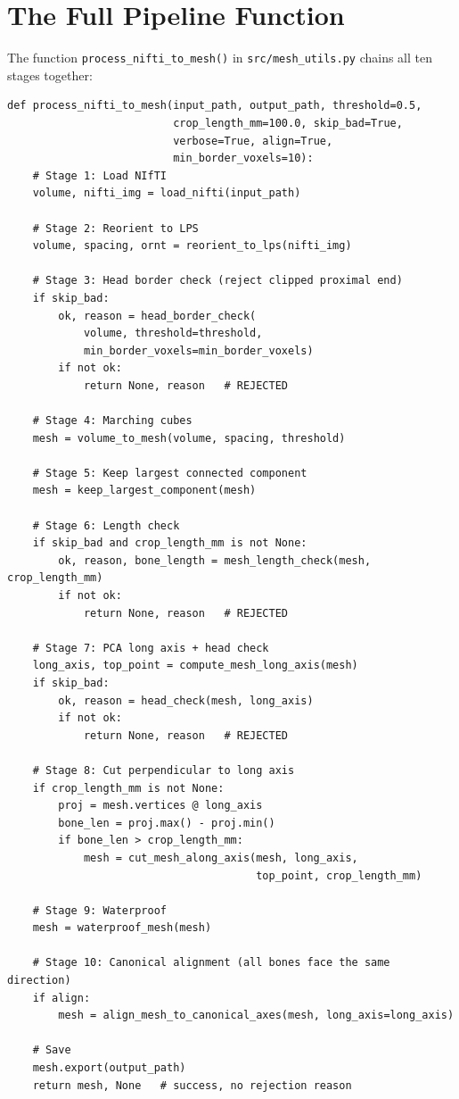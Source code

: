 \documentclass[12pt,a4paper]{article}
\begin{document}
\section{The Full Pipeline Function}

The function \texttt{process\_nifti\_to\_mesh()} in \texttt{src/mesh\_utils.py}
chains all ten stages together:

\begin{lstlisting}
def process_nifti_to_mesh(input_path, output_path, threshold=0.5,
                          crop_length_mm=100.0, skip_bad=True,
                          verbose=True, align=True,
                          min_border_voxels=10):
    # Stage 1: Load NIfTI
    volume, nifti_img = load_nifti(input_path)

    # Stage 2: Reorient to LPS
    volume, spacing, ornt = reorient_to_lps(nifti_img)

    # Stage 3: Head border check (reject clipped proximal end)
    if skip_bad:
        ok, reason = head_border_check(
            volume, threshold=threshold,
            min_border_voxels=min_border_voxels)
        if not ok:
            return None, reason   # REJECTED

    # Stage 4: Marching cubes
    mesh = volume_to_mesh(volume, spacing, threshold)

    # Stage 5: Keep largest connected component
    mesh = keep_largest_component(mesh)

    # Stage 6: Length check
    if skip_bad and crop_length_mm is not None:
        ok, reason, bone_length = mesh_length_check(mesh, crop_length_mm)
        if not ok:
            return None, reason   # REJECTED

    # Stage 7: PCA long axis + head check
    long_axis, top_point = compute_mesh_long_axis(mesh)
    if skip_bad:
        ok, reason = head_check(mesh, long_axis)
        if not ok:
            return None, reason   # REJECTED

    # Stage 8: Cut perpendicular to long axis
    if crop_length_mm is not None:
        proj = mesh.vertices @ long_axis
        bone_len = proj.max() - proj.min()
        if bone_len > crop_length_mm:
            mesh = cut_mesh_along_axis(mesh, long_axis,
                                       top_point, crop_length_mm)

    # Stage 9: Waterproof
    mesh = waterproof_mesh(mesh)

    # Stage 10: Canonical alignment (all bones face the same direction)
    if align:
        mesh = align_mesh_to_canonical_axes(mesh, long_axis=long_axis)

    # Save
    mesh.export(output_path)
    return mesh, None   # success, no rejection reason
\end{lstlisting}
\end{document}
